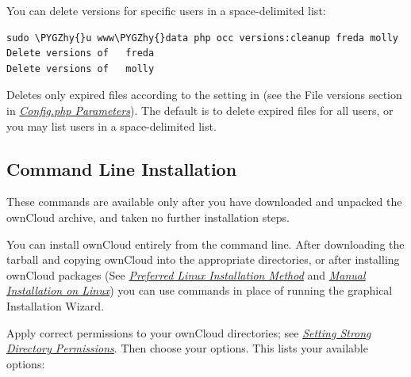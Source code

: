 \documentclass[letterpaper,10pt,english]{sphinxmanual}
\def\PYGZhy{\char`\-}
\begin{document}
You can delete versions for specific users in a space-delimited list:

\begin{Verbatim}[commandchars=\\\{\}]
sudo \PYGZhy{}u www\PYGZhy{}data php occ versions:cleanup freda molly
Delete versions of   freda
Delete versions of   molly
\end{Verbatim}

 Deletes only expired files according to the  setting in  (see the File versions section in {\hyperref[configuration_server/config_sample_php_parameters::doc]{\emph{Config.php Parameters}}}). The default is to delete expired files for all users, or you may list users in a space-delimited list.


\subsection{Command Line Installation}
\label{configuration_server/occ_command:command-line-installation-label}\label{configuration_server/occ_command:command-line-installation}
These commands are available only after you have downloaded and unpacked the
ownCloud archive, and taken no further installation steps.

You can install ownCloud entirely from the command line. After downloading the
tarball and copying ownCloud into the appropriate directories, or
after installing ownCloud packages (See
{\hyperref[installation/linux_installation::doc]{\emph{Preferred Linux Installation Method}}} and
{\hyperref[installation/source_installation::doc]{\emph{Manual Installation on Linux}}}) you can use  commands in
place of running the graphical Installation Wizard.

Apply correct permissions to your ownCloud directories; see
{\hyperref[installation/installation_wizard:strong-perms-label]{\emph{Setting Strong Directory Permissions}}}. Then choose your  options. This lists your
available options:
\end{document}
